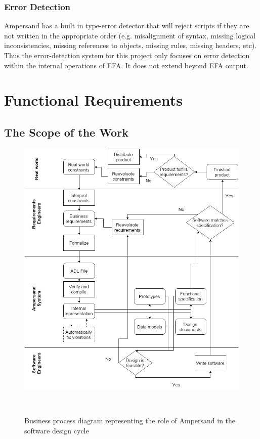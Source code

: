 \documentclass[12pt]{report}
\begin{document}
\subsection{Error Detection}
Ampersand has a built in type-error detector that will reject scripts if they 
are not written in the appropriate order (e.g. misalignment of syntax, missing 
logical inconsistencies, missing references to objects, missing rules, missing 
headers, etc). Thus the error-detection system for this project only focuses on 
error detection within the internal operations of EFA. It does not extend 
beyond EFA output.
\chapter{Functional Requirements}\label{ch:Functional}
\section{The Scope of the Work}\label{sec:ScopeOfWork}

\begin{figure}[!htb]
\begin{center}
\includegraphics[width=\textwidth]{../figures/business_process}
\caption{Business process diagram representing the role of Ampersand in the
  software design cycle}~\label{fig:BusinessProcess}
\end{center}
\end{figure}
\end{document}
